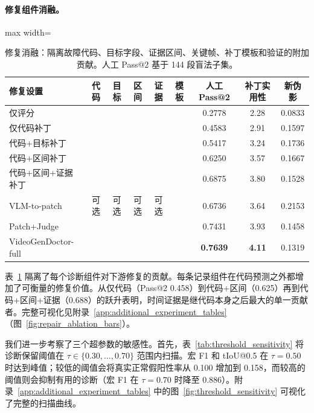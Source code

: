 \documentclass{article}
\newcommand{\cmark}{\ding{51}}
\newcommand{\xmark}{\ding{55}}
\begin{document}
\paragraph{修复组件消融。}
\begin{table}[t]
\centering\scriptsize
\caption{修复消融：隔离故障代码、目标字段、证据区间、关键帧、补丁模板和验证的附加贡献。人工 Pass@2 基于 144 段盲法子集。}
\label{tab:repair_ablation}
\begin{adjustbox}{max width=\textwidth}
\begin{tabular}{p{}cccccccc}
\toprule
修复设置 & 代码 & 目标 & 区间 & 证据 & 模板 & 人工 Pass@2 & 补丁实用性 & 新伪影 \\
\midrule
仅评分 & \xmark & \xmark & \xmark & \xmark & \xmark & 0.2778 & 2.28 & 0.0833 \\
仅代码补丁 & \cmark & \xmark & \xmark & \xmark & \cmark & 0.4583 & 2.91 & 0.1597 \\
代码+目标补丁 & \cmark & \cmark & \xmark & \xmark & \cmark & 0.5417 & 3.24 & 0.1736 \\
代码+区间补丁 & \cmark & \xmark & \cmark & \xmark & \cmark & 0.6250 & 3.57 & 0.1667 \\
代码+区间+证据补丁 & \cmark & \xmark & \cmark & \cmark & \cmark & 0.6875 & 3.80 & 0.1528 \\
VLM-to-patch & 可选 & 可选 & 可选 & 可选 & \xmark & 0.6736 & 3.64 & 0.2153 \\
Patch+Judge & \cmark & \cmark & \cmark & \cmark & \cmark & 0.7431 & 3.93 & 0.1458 \\
VideoGenDoctor-full & \cmark & \cmark & \cmark & \cmark & \cmark & \textbf{0.7639} & \textbf{4.11} & 0.1319 \\
\bottomrule
\end{tabular}
\end{adjustbox}
\end{table}

表~\ref{tab:repair_ablation} 隔离了每个诊断组件对下游修复的贡献。每条记录组件在代码预测之外都增加了可衡量的修复价值。从仅代码（Pass@2 0.458）到代码+区间（0.625）再到代码+区间+证据（0.688）的跃升表明，时间证据是继代码本身之后最大的单一贡献者。完整可视化见附录~\ref{app:additional_experiment_tables}（图~\ref{fig:repair_ablation_bars}）。

我们进一步考察了三个超参数的敏感性。首先，表~\ref{tab:threshold_sensitivity} 将诊断保留阈值在 $\tau \in \{0.30,\dots,0.70\}$ 范围内扫描。宏 F1 和 tIoU@0.5 在 $\tau=0.50$ 时达到峰值；较低的阈值会将真实正常假阳性率从 0.100 增加到 0.158，而较高的阈值则会抑制有用的诊断（宏 F1 在 $\tau=0.70$ 时降至 0.886）。附录~\ref{app:additional_experiment_tables} 中的图~\ref{fig:threshold_sensitivity} 可视化了完整的扫描曲线。
\end{document}
